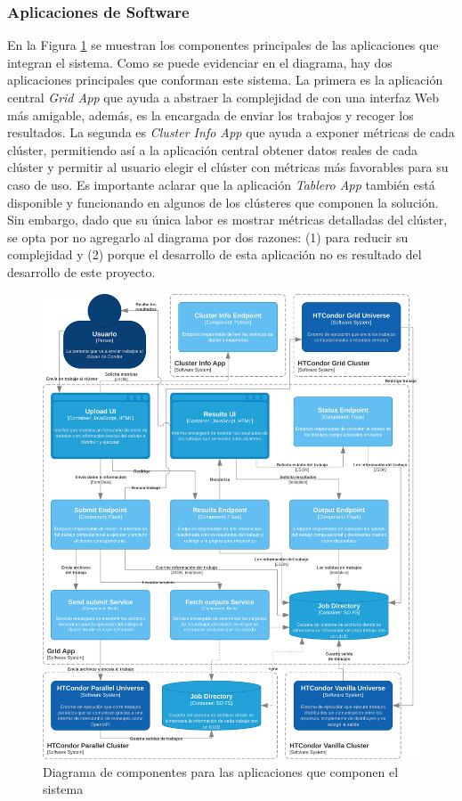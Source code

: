 \subsubsection{Aplicaciones de Software}
\noindent
En la Figura \ref{fig:C4Nivel3Apps} se muestran los componentes principales de las aplicaciones que integran el sistema. Como se puede evidenciar en el diagrama, hay dos aplicaciones principales que conforman este sistema. La primera es la aplicación central \textit{Grid App} que ayuda a abstraer la complejidad de \HTCondor con una interfaz Web más amigable, además, es la encargada de enviar los trabajos y recoger los resultados. La segunda es \textit{Cluster Info App} que ayuda a exponer métricas de cada clúster, permitiendo así a la aplicación central obtener datos reales de cada clúster y permitir al usuario elegir el clúster con métricas más favorables para su caso de uso. Es importante aclarar que la aplicación \textit{Tablero App} también está disponible y funcionando en algunos de los clústeres que componen la solución. Sin embargo, dado que su única labor es mostrar métricas detalladas del clúster, se opta por no agregarlo al diagrama por dos razones: (1) para reducir su complejidad y (2) porque el desarrollo de esta aplicación no es resultado del desarrollo de este proyecto.

\begin{figure}[H]
	\centering
	\includegraphics[scale=0.09]{tablas-images/C4/Diagramas HTCondor-Nivel 3 - Apps.drawio.png}
	\caption{Diagrama de componentes para las aplicaciones que componen el sistema}
    \label{fig:C4Nivel3Apps}
\end{figure}


